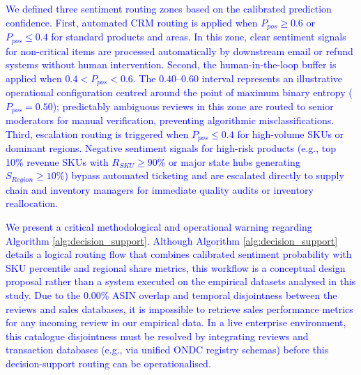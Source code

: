 \documentclass[authoryear,review,3p,times,12pt]{elsarticle}
\newcommand{\update}[1]{\textcolor{blue}{#1}}
\begin{document}
\update{We defined three sentiment routing zones based on the calibrated prediction confidence. First, automated CRM routing is applied when $P_{pos} \ge 0.6$ or $P_{pos} \le 0.4$ for standard products and areas. In this zone, clear sentiment signals for non-critical items are processed automatically by downstream email or refund systems without human intervention. Second, the human-in-the-loop buffer is applied when $0.4 < P_{pos} < 0.6$. The $0.40$--$0.60$ interval represents an illustrative operational configuration centred around the point of maximum binary entropy ($P_{pos} = 0.50$); predictably ambiguous reviews in this zone are routed to senior moderators for manual verification, preventing algorithmic misclassifications. Third, escalation routing is triggered when $P_{pos} \le 0.4$ for high-volume SKUs or dominant regions. Negative sentiment signals for high-risk products (e.g., top 10\% revenue SKUs with $R_{SKU} \ge 90\%$ or major state hubs generating $S_{Region} \ge 10\%$) bypass automated ticketing and are escalated directly to supply chain and inventory managers for immediate quality audits or inventory reallocation.}

\update{We present a critical methodological and operational warning regarding Algorithm \ref{alg:decision_support}. Although Algorithm \ref{alg:decision_support} details a logical routing flow that combines calibrated sentiment probability with SKU percentile and regional share metrics, this workflow is a conceptual design proposal rather than a system executed on the empirical datasets analysed in this study. Due to the 0.00\% ASIN overlap and temporal disjointness between the reviews and sales databases, it is impossible to retrieve sales performance metrics for any incoming review in our empirical data. In a live enterprise environment, this catalogue disjointness must be resolved by integrating reviews and transaction databases (e.g., via unified ONDC registry schemas) before this decision-support routing can be operationalised.}
\end{document}
